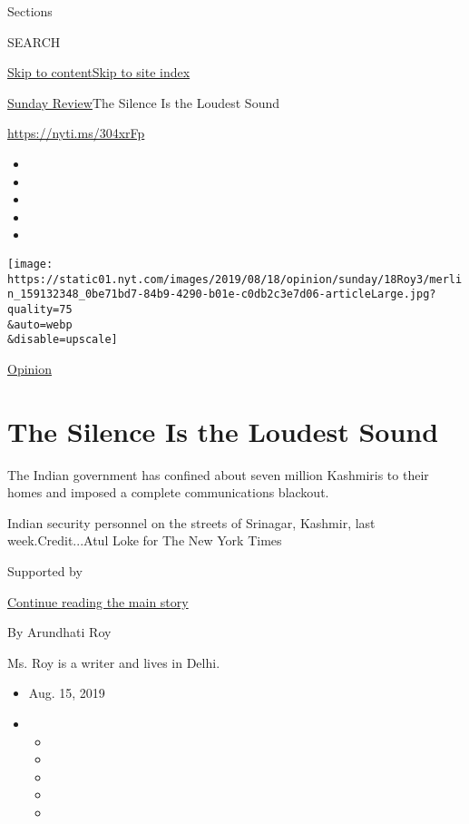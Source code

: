 Sections

SEARCH

\protect\hyperlink{site-content}{Skip to
content}\protect\hyperlink{site-index}{Skip to site index}

\href{/section/opinion/sunday}{Sunday Review}\textbar{}The Silence Is
the Loudest Sound

\url{https://nyti.ms/304xrFp}

\begin{itemize}
\item
\item
\item
\item
\item
\end{itemize}

\texttt{[image: https://static01.nyt.com/images/2019/08/18/opinion/sunday/18Roy3/merlin\_159132348\_0be71bd7-84b9-4290-b01e-c0db2c3e7d06-articleLarge.jpg?quality=75\\\&auto=webp\\\&disable=upscale]}

\href{/section/opinion}{Opinion}

\hypertarget{the-silence-is-the-loudest-sound}{%
\section{The Silence Is the Loudest
Sound}\label{the-silence-is-the-loudest-sound}}

The Indian government has confined about seven million Kashmiris to
their homes and imposed a complete communications blackout.

Indian security personnel on the streets of Srinagar, Kashmir, last
week.Credit...Atul Loke for The New York Times

Supported by

\protect\hyperlink{after-sponsor}{Continue reading the main story}

By Arundhati Roy

Ms. Roy is a writer and lives in Delhi.

\begin{itemize}
\item
  Aug. 15, 2019
\item
  \begin{itemize}
  \item
  \item
  \item
  \item
  \item
  \end{itemize}
\end{itemize}

